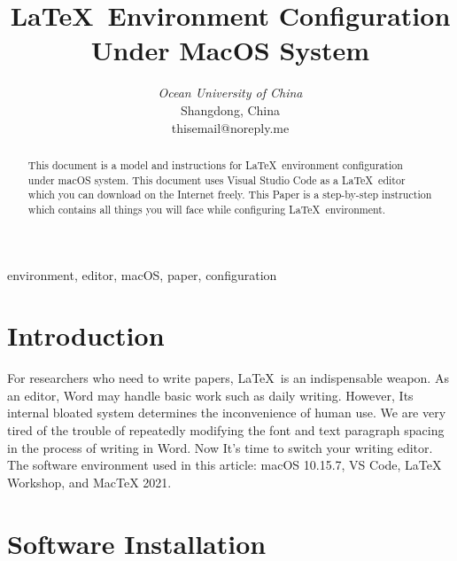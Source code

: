 \documentclass[conference]{IEEEtran}
\begin{document}

\title{\LaTeX\ Environment Configuration Under MacOS System\\
}


\author{
\textit{Ocean University of China}\\
Shangdong, China \\
thisemail@noreply.me}

\maketitle

\begin{abstract}
This document is a model and instructions for \LaTeX\ environment configuration under macOS system.
This document uses Visual Studio Code as a \LaTeX\ editor which you can download on the Internet freely.
This Paper is a step-by-step instruction which contains all things you will face while configuring \LaTeX\ environment.
\end{abstract}

\begin{IEEEkeywords}
environment, editor, macOS, paper, configuration
\end{IEEEkeywords}

\section{Introduction}
For researchers who need to write papers, \LaTeX\ is an indispensable weapon. 
As an editor, Word may handle basic work such as daily writing. 
However, Its internal bloated system determines the inconvenience of human use. 
We are very tired of the trouble of repeatedly modifying the font and text paragraph spacing in the process of writing in Word. 
Now It's time to switch your writing editor.
The software environment used in this article: macOS 10.15.7, VS Code, LaTeX Workshop, and MacTeX 2021.

\section{Software Installation}
\end{document}

